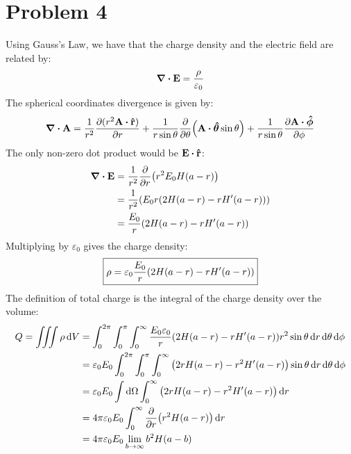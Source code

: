 \documentclass[12pt]{article}
\begin{document}
\section*{Problem 4}
Using Gauss's Law, we have that the charge density and the electric field are related by:
\begin{align*}
  \div{\vb{E}}=\frac{\rho}{\varepsilon_0}
\end{align*}
The spherical coordinates divergence is given by:
\begin{align*}
  \div{\vb{A}}=\frac{1}{r^2}\pdv{(r^2\vb{A}\vdot\vu{r})}{r}
  +\frac1{r\sin\theta}\pdv{\theta}(\vb{A}\vdot\bm{\hat\theta}\sin\theta)
  +\frac1{r\sin\theta}\pdv{\vb{A}\vdot\bm{\hat\phi}}{\phi}
\end{align*}
The only non-zero dot product would be $\vb{E}\vdot\vu{r}$:
\begin{align*}
  \div{\vb{E}}&=\frac1{r^2}\pdv{r}\qty(r^2E_0H(a-r))\\
  &=\frac1{r^2}\qty(E_0r\qty(2H(a-r)-rH'(a-r)))\\
  &=\frac{E_0}{r}\qty(2H(a-r)-rH'(a-r))
\end{align*}
Multiplying by $\varepsilon_0$ gives the charge density:
\begin{align}
  \boxed{
    \rho=\varepsilon_0\frac{E_0}{r}\qty(2H(a-r)-rH'(a-r))
  }
\end{align}
The definition of total charge is the integral of the charge density over the volume:
\begin{align*}
  Q=\iiint\rho\dd{V}&=\int_0^{2\pi}\int_0^\pi\int_0^\infty
  \frac{E_0\varepsilon_0}{r}\qty(2H(a-r)-rH'(a-r))r^2
  \sin\theta\dd{r}\dd{\theta}\dd{\phi}\\
  &=\varepsilon_0E_0\int_0^{2\pi}\int_0^\pi\int_0^\infty
  \qty(2rH(a-r)-r^2H'(a-r))\sin\theta\dd{r}\dd{\theta}\dd{\phi}\\
  &=\varepsilon_0E_0\int\dd{\Omega}\int_0^\infty\qty(2rH(a-r)-r^2H'(a-r))\dd{r}\\
  &=4\pi\varepsilon_0E_0\int_0^\infty\pdv{r}\qty(r^2H(a-r))\dd{r}\\
  &=4\pi\varepsilon_0E_0\lim_{b\to\infty}b^2H(a-b)
\end{align*}
\end{document}
